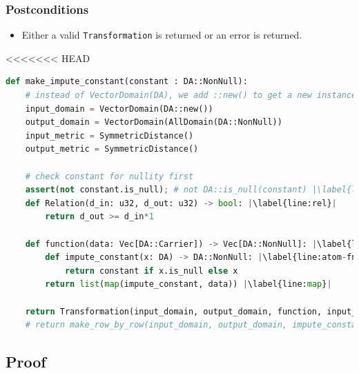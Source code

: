\documentclass[11pt,a4paper]{article}
\newcommand{\grace}[1]{{ {\color{purple}{(grace)~#1}}}}
\begin{document}
\subsubsection*{Postconditions}

\begin{itemize}
    \item Either a valid \texttt{Transformation} is returned or an error is returned.
\end{itemize}

<<<<<<< HEAD

\begin{lstlisting}[language=Python,  escapechar=|]
def make_impute_constant(constant : DA::NonNull):
    # instead of VectorDomain(DA), we add ::new() to get a new instance of DA. This is bcause DA has the ImputableDomain trait. Discuss among interns.
    input_domain = VectorDomain(DA::new())
    output_domain = VectorDomain(AllDomain(DA::NonNull))
    input_metric = SymmetricDistance()
    output_metric = SymmetricDistance()
    
    # check constant for nullity first
    assert(not constant.is_null); # not DA::is_null(constant) |\label{line:null}|
    def Relation(d_in: u32, d_out: u32) -> bool: |\label{line:rel}|
        return d_out >= d_in*1

    def function(data: Vec[DA::Carrier]) -> Vec[DA::NonNull]: |\label{line:fn}|
        def impute_constant(x: DA) -> DA::NonNull: |\label{line:atom-fn}|
            return constant if x.is_null else x
        return list(map(impute_constant, data)) |\label{line:map}|
        
    return Transformation(input_domain, output_domain, function, input_metric, output_metric, stability_relation=Relation)
    # return make_row_by_row(input_domain, output_domain, impute_constant);
\end{lstlisting}

\grace{ Will need to change pseudocode so that it returns the result of a make row by row transformation (which the code does) instead of a Transformation directly.}

\subsection{Proof}
\grace{Should this go in the proofs list?}
\grace{I'm also confused why we have implementation of DA::NonNull but it doesn't do what the name says. Seems pretty counter intuitive.}
\end{document}
